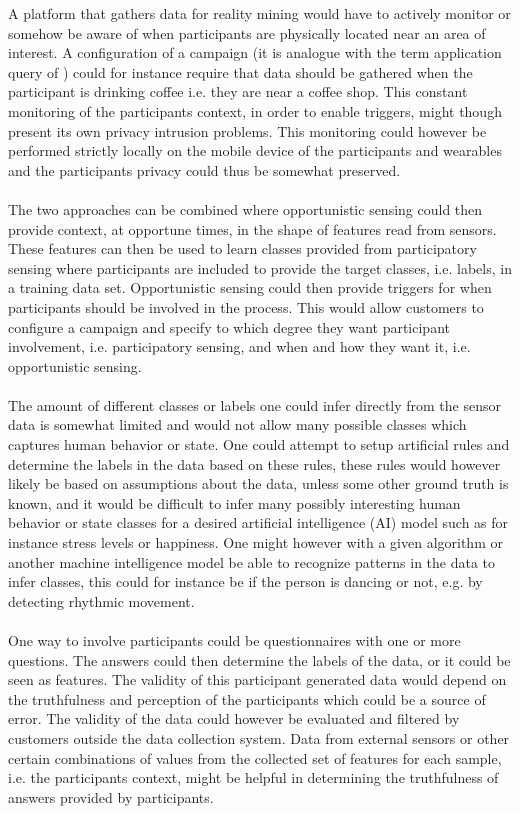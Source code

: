 A platform that gathers data for reality mining would have to actively monitor or somehow be aware of when participants are physically located near an area of interest. A configuration of a campaign (it is analogue with the term application query of \parencite{opp_or_par}) could for instance require that data should be gathered when the participant is drinking coffee i.e. they are near a coffee shop. This constant monitoring of the participants context, in order to enable triggers, might though present its own privacy intrusion problems. This monitoring could however be performed strictly locally on the mobile device of the participants and wearables and the participants privacy could thus be somewhat preserved.
\\\\
The two approaches can be combined where opportunistic sensing could then provide context, at opportune times, in the shape of features read from sensors. These features can then be used to learn classes provided from participatory sensing where participants are included to provide the target classes, i.e. labels, in a training data set. Opportunistic sensing could then provide triggers for when participants should be involved in the process. This would allow customers to configure a campaign and specify to which degree they want participant involvement, i.e. participatory sensing, and when and how they want it, i.e. opportunistic sensing.
\\\\
The amount of different classes or labels one could infer directly from the sensor data is somewhat limited and would not allow many possible classes which captures human behavior or state. One could attempt to setup artificial rules and determine the labels in the data based on these rules, these rules would however likely be based on assumptions about the data, unless some other ground truth is known, and it would be difficult to infer many possibly interesting human behavior or state classes for a desired artificial intelligence (AI) model such as for instance stress levels or happiness. One might however with a given algorithm or another machine intelligence model be able to recognize patterns in the data to infer classes, this could for instance be if the person is dancing or not, e.g. by detecting rhythmic movement.    
\\\\
One way to involve participants could be questionnaires with one or more questions. The answers could then determine the labels of the data, or it could be seen as features. The validity of this participant generated data would depend on the truthfulness and perception of the participants which could be a source of error. The validity of the data could however be evaluated and filtered by customers outside the data collection system. Data from external sensors or other certain combinations of values from the collected set of features for each sample, i.e. the participants context, might be helpful in determining the truthfulness of answers provided by participants.
